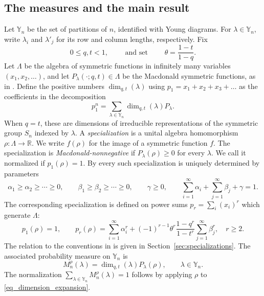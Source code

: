 \documentclass[11pt,reqno]{amsart}
\theoremstyle{definition}
\theoremstyle{remark}
\numberwithin{equation}{section}
\newcommand{\Y}{\mathbb Y}
\newcommand{\R}{\mathbb R}
\newcommand{\ddim}{\operatorname{dim}_{q,t}}
\begin{document}
\subsection{The measures and the main result}
Let $\Y_n$ be the set of partitions of $n$, identified with Young diagrams.
For $\lambda\in\Y_n$, write $\lambda_i$ and $\lambda'_j$ for its row and
column lengths, respectively. Fix
\[
  0\le q,t<1,\qquad\text{ and set }\qquad \theta=\frac{1-t}{1-q}.
\]
Let $\Lambda$ be the algebra of symmetric functions in infinitely many variables $(x_1,x_2,\dots)$,
and let $P_\lambda(\cdot;q,t)\in\Lambda$ be the Macdonald symmetric functions, as in \cite[Chapter~VI]{Mac95}. Define the positive numbers
$\ddim(\lambda)$ using $p_1=x_1+x_2+x_3+\dots$ as the coefficients in the decomposition
\begin{equation}\label{eq_dimension_expansion}
  p_1^n=\sum_{\lambda\in\Y_n}\ddim(\lambda)P_\lambda.
\end{equation}
When $q=t$, these are dimensions of irreducible representations of the symmetric group $S_n$ indexed by $\lambda$. A \emph{specialization} is a unital algebra homomorphism $\rho:\Lambda\to\R$. We write $f(\rho)$ for
the image of a symmetric function $f$. The specialization is \emph{Macdonald-nonnegative}
if $P_\lambda(\rho)\ge0$ for every $\lambda$.
We call it normalized if $p_1(\rho)=1$. By \cite[Theorem 1.4]{Mat19} every such
specialization is uniquely determined by parameters
\begin{equation}\label{eq_parameter_space}
 \alpha_1\ge\alpha_2\ge\cdots\ge0,\qquad
 \beta_1\ge\beta_2\ge\cdots\ge0,\qquad \gamma\ge0,\qquad
 \sum_{i=1}^{\infty}\alpha_i+\sum_{j=1}^{\infty}\beta_j+\gamma=1.
\end{equation}
The corresponding specialization is defined on power sums $p_r=\sum_i (x_i)^r$ which generate $\Lambda$:
\begin{equation}\label{eq_power_sums_specialization}
 p_1(\rho)=1,\qquad
 p_r(\rho)=\sum_{i=1}^{\infty}\alpha_i^r+
 (-1)^{r-1}\theta^r\frac{1-q^r}{1-t^r}\sum_{j=1}^{\infty}\beta_j^r,
 \quad r\ge2.
\end{equation}
The relation to the conventions in
\cite{BC14,BP15,Mat19} is given in Section~\ref{sec:specializations}. The associated probability measure on $\Y_n$ is
\begin{equation}\label{eq_coherent_measure}
 M_n^\rho(\lambda)=\ddim(\lambda)P_\lambda(\rho),\qquad \lambda\in\Y_n.
\end{equation}
The normalization $\sum_{\lambda\in\Y_n} M_n^\rho(\lambda)=1$ follows by applying $\rho$ to
\eqref{eq_dimension_expansion}.
\end{document}
